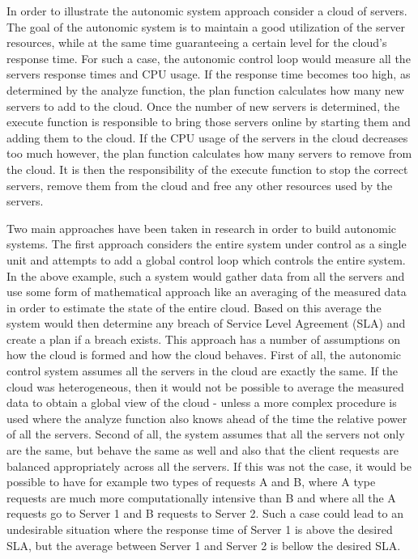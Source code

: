 In order to illustrate the autonomic system approach consider a cloud of servers. The goal of the autonomic system is to maintain a good utilization of the server resources, while at the same time guaranteeing a certain level for the cloud's response time. For such a case, the autonomic control loop would measure all the servers response times and CPU usage. If the response time becomes too high, as determined by the analyze function, the plan function calculates how many new servers to add to the cloud. Once the number of new servers is determined, the execute function is responsible to bring those servers online by starting them and adding them to the cloud. If the CPU usage of the servers in the cloud decreases too much however, the plan function calculates how many servers to remove from the cloud. It is then the responsibility of the execute function to stop the correct servers, remove them from the cloud and free any other resources used by the servers.

Two main approaches have been taken in research in order to build autonomic systems. The first approach considers the entire system under control as a single unit and attempts to add a global control loop which controls the entire system. In the above example, such a system would gather data from all the servers and use some form of mathematical approach like an averaging of the measured data in order to estimate the state of the entire cloud. Based on this average the system would then determine any breach of Service Level Agreement (SLA) and create a plan if a breach exists. This approach has a number of assumptions on how the cloud is formed and how the cloud behaves. First of all, the autonomic control system assumes all the servers in the cloud are exactly the same. If the cloud was heterogeneous, then it would not be possible to average the measured data to obtain a global view of the cloud - unless a more complex procedure is used where the analyze function also knows ahead of the time the relative power of all the servers. Second of all, the system assumes that all the servers not only are the same, but behave the same as well and also that the client requests are balanced appropriately across all the servers. If this was not the case, it would be possible to have for example two types of requests A and B, where A type requests are much more computationally intensive than B and where all the A requests go to Server 1 and B requests to Server 2. Such a case could lead to an undesirable situation where the response time of Server 1 is above the desired SLA, but the average between Server 1 and Server 2 is bellow the desired SLA.

